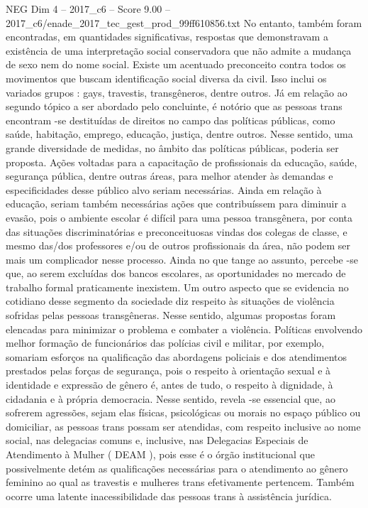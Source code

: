 \begin{textsample}{NEG Dim 4 – 2017\_c6 – Score 9.00 – 2017\_c6/enade\_2017\_tec\_gest\_prod\_99ff610856.txt}
No entanto, também foram encontradas, em quantidades significativas, respostas que demonstravam a existência de uma interpretação social conservadora que não admite a mudança de sexo nem do nome social.
Existe um acentuado preconceito contra todos os movimentos que buscam identificação social diversa da civil.
Isso inclui os variados grupos : gays, travestis, transgêneros, dentre outros.
Já em relação ao segundo tópico a ser abordado pelo concluinte, é notório que as pessoas trans encontram -se destituídas de direitos no campo das políticas públicas, como saúde, habitação, emprego, educação, justiça, dentre outros.
Nesse sentido, uma grande diversidade de medidas, no âmbito das políticas públicas, poderia ser proposta.
Ações voltadas para a capacitação de profissionais da educação, saúde, segurança pública, dentre outras áreas, para melhor atender às demandas e especificidades desse público alvo seriam necessárias.
Ainda em relação à educação, seriam também necessárias ações que contribuíssem para diminuir a evasão, pois o ambiente escolar é difícil para uma pessoa transgênera, por conta das situações discriminatórias e preconceituosas vindas dos colegas de classe, e mesmo das/dos professores e/ou de outros profissionais da área, não podem ser mais um complicador nesse processo.
Ainda no que tange ao assunto, percebe -se que, ao serem excluídas dos bancos escolares, as oportunidades no mercado de trabalho formal praticamente inexistem.
Um outro aspecto que se evidencia no cotidiano desse segmento da sociedade diz respeito às situações de violência sofridas pelas pessoas transgêneras.
Nesse sentido, algumas propostas foram elencadas para minimizar o problema e combater a violência.
Políticas envolvendo melhor formação de funcionários das polícias civil e militar, por exemplo, somariam esforços na qualificação das abordagens policiais e dos atendimentos prestados pelas forças de segurança, pois o respeito à orientação sexual e à identidade e expressão de gênero é, antes de tudo, o respeito à dignidade, à cidadania e à própria democracia.
Nesse sentido, revela -se essencial que, ao sofrerem agressões, sejam elas físicas, psicológicas ou morais no espaço público ou domiciliar, as pessoas trans possam ser atendidas, com respeito inclusive ao nome social, nas delegacias comuns e, inclusive, nas Delegacias Especiais de Atendimento à Mulher ( DEAM ), pois esse é o órgão institucional que possivelmente detém as qualificações necessárias para o atendimento ao gênero feminino ao qual as travestis e mulheres trans efetivamente pertencem.
Também ocorre uma latente inacessibilidade das pessoas trans à assistência jurídica.

\end{textsample}
